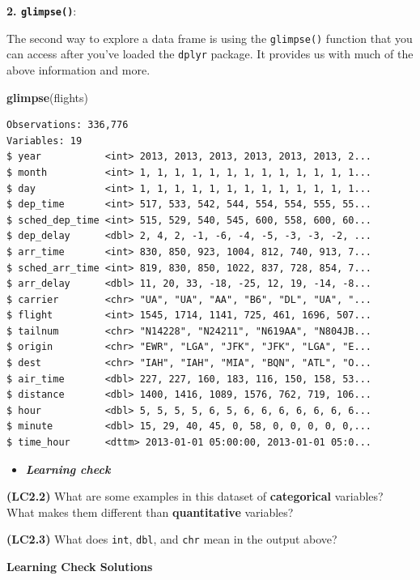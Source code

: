 \documentclass[12pt,]{krantz}
\makeatletter
\newenvironment{Shaded}{\begin{snugshade}}{\end{snugshade}}
\newcommand{\KeywordTok}[1]{\textcolor[rgb]{0.27,0.27,0.27}{\textbf{#1}}}
\newcommand{\NormalTok}[1]{#1}
\newenvironment{kframe}{%
\medskip{}
\setlength{\fboxsep}{.8em}
 \def\at@end@of@kframe{}%
 \ifinner\ifhmode%
  \def\at@end@of@kframe{\end{minipage}}%
  \begin{minipage}{\columnwidth}%
 \fi\fi%
 \def\FrameCommand##1{\hskip\@totalleftmargin \hskip-\fboxsep
 \colorbox{shadecolor}{##1}\hskip-\fboxsep
     \hskip-\linewidth \hskip-\@totalleftmargin \hskip\columnwidth}%
 \MakeFramed {\advance\hsize-\width
   \@totalleftmargin\z@ \linewidth\hsize
   \@setminipage}}%
 {\par\unskip\endMakeFramed%
 \at@end@of@kframe}
\renewenvironment{Shaded}{\begin{kframe}}{\end{kframe}}
\newenvironment{rmdblock}[1]
  {\begin{shaded*}
  \begin{itemize}
  \renewcommand{\labelitemi}{
    \raisebox{-.7\height}[0pt][0pt]{
    }
  }
  \item
  }
  {
  \end{itemize}
  \end{shaded*}
  }
\newenvironment{learncheck}
  {\begin{rmdblock}{warning}}
  {\end{rmdblock}}
\makeatother
\begin{document}
\textbf{2. \texttt{glimpse()}}:

The second way to explore a data frame is using the \texttt{glimpse()}
function that you can access after you've loaded the \texttt{dplyr}
package. It provides us with much of the above information and more.

\begin{Shaded}
\begin{Highlighting}[]
\KeywordTok{glimpse}\NormalTok{(flights)}
\end{Highlighting}
\end{Shaded}

\begin{verbatim}
Observations: 336,776
Variables: 19
$ year           <int> 2013, 2013, 2013, 2013, 2013, 2013, 2...
$ month          <int> 1, 1, 1, 1, 1, 1, 1, 1, 1, 1, 1, 1, 1...
$ day            <int> 1, 1, 1, 1, 1, 1, 1, 1, 1, 1, 1, 1, 1...
$ dep_time       <int> 517, 533, 542, 544, 554, 554, 555, 55...
$ sched_dep_time <int> 515, 529, 540, 545, 600, 558, 600, 60...
$ dep_delay      <dbl> 2, 4, 2, -1, -6, -4, -5, -3, -3, -2, ...
$ arr_time       <int> 830, 850, 923, 1004, 812, 740, 913, 7...
$ sched_arr_time <int> 819, 830, 850, 1022, 837, 728, 854, 7...
$ arr_delay      <dbl> 11, 20, 33, -18, -25, 12, 19, -14, -8...
$ carrier        <chr> "UA", "UA", "AA", "B6", "DL", "UA", "...
$ flight         <int> 1545, 1714, 1141, 725, 461, 1696, 507...
$ tailnum        <chr> "N14228", "N24211", "N619AA", "N804JB...
$ origin         <chr> "EWR", "LGA", "JFK", "JFK", "LGA", "E...
$ dest           <chr> "IAH", "IAH", "MIA", "BQN", "ATL", "O...
$ air_time       <dbl> 227, 227, 160, 183, 116, 150, 158, 53...
$ distance       <dbl> 1400, 1416, 1089, 1576, 762, 719, 106...
$ hour           <dbl> 5, 5, 5, 5, 6, 5, 6, 6, 6, 6, 6, 6, 6...
$ minute         <dbl> 15, 29, 40, 45, 0, 58, 0, 0, 0, 0, 0,...
$ time_hour      <dttm> 2013-01-01 05:00:00, 2013-01-01 05:0...
\end{verbatim}

\begin{learncheck}
\textbf{\emph{Learning check}}
\end{learncheck}

\textbf{(LC2.2)} What are some examples in this dataset of
\textbf{categorical} variables? What makes them different than
\textbf{quantitative} variables?

\textbf{(LC2.3)} What does \texttt{int}, \texttt{dbl}, and \texttt{chr}
mean in the output above?

\textbf{Learning Check Solutions}
\end{document}

